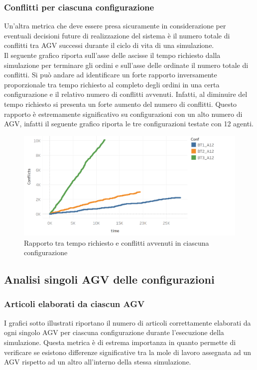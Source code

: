 \documentclass[12pt]{article}
\begin{document}
\subsubsection{Conflitti per ciascuna configurazione}
Un'altra metrica che deve essere presa sicuramente in considerazione per eventuali decisioni future di realizzazione del sistema è il numero totale di conflitti tra AGV successi durante il ciclo di vita di una simulazione.\\
Il seguente grafico riporta sull'asse delle ascisse il tempo richiesto dalla simulazione per terminare gli ordini e sull'asse delle ordinate il numero totale di conflitti. Si può andare ad identificare un forte rapporto inversamente proporzionale tra tempo richiesto al completo degli ordini in una certa configurazione e il relativo numero di conflitti avvenuti. Infatti, al diminuire del tempo richiesto si presenta un forte aumento del numero di conflitti. Questo rapporto è estremamente significativo su configurazioni con un alto numero di AGV, infatti il seguente grafico riporta le tre configurazioni testate con 12 agenti.
\begin{figure}[H]
\centering
  \includegraphics[width=1\linewidth]{Figures/Results_Graphics/Rapporto_tempoconflitti.png}
  \caption{Rapporto tra tempo richiesto e conflitti avvenuti in ciascuna configurazione}\label{fig:articles_agv_bt1}
\end{figure}

\newpage
\subsection{Analisi singoli AGV delle configurazioni}
\subsubsection{Articoli elaborati da ciascun AGV}
\noindent I grafici sotto illustrati riportano il numero di articoli correttamente elaborati da ogni singolo AGV per ciascuna configurazione durante l'esecuzione della simulazione. Questa metrica è di estrema importanza in quanto permette di verificare se esistono differenze significative tra la mole di lavoro assegnata ad un AGV rispetto ad un altro all'interno della stessa simulazione.
\end{document}
